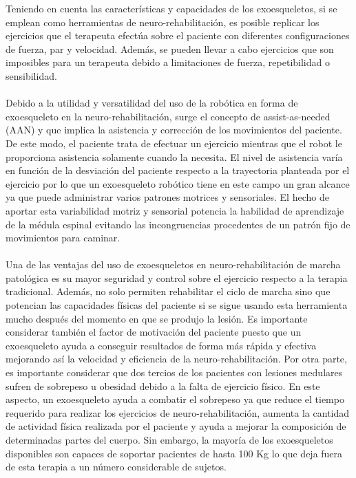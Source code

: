 Teniendo en cuenta las características y capacidades de los exoesqueletos, si se emplean como herramientas de neuro-rehabilitación, es posible replicar los ejercicios que el terapeuta efectúa sobre el paciente con diferentes configuraciones de fuerza, par y velocidad. Además, se pueden llevar a cabo ejercicios que son imposibles para un terapeuta debido a limitaciones de fuerza, repetibilidad o sensibilidad\cite{robotica_rehabilitacion}.
\\
\\
Debido a la utilidad y versatilidad del uso de la robótica en forma de exoesqueleto en la neuro-rehabilitación, surge el concepto de assist-as-needed (AAN)\cite{assist_as_need} y que implica la asistencia y corrección de los movimientos del paciente. De este modo, el paciente trata de efectuar un ejercicio mientras que el robot le proporciona asistencia solamente cuando la necesita. El nivel de asistencia varía en función de la desviación del paciente respecto a la trayectoria planteada por el ejercicio por lo que un exoesqueleto robótico tiene en este campo un gran alcance ya que puede administrar varios patrones motrices y sensoriales. El hecho de aportar esta variabilidad motriz y sensorial potencia la habilidad de aprendizaje de la médula espinal evitando las incongruencias procedentes de un patrón fijo de movimientos para caminar.
\\
\\
Una de las ventajas del uso de exoesqueletos en neuro-rehabilitación de marcha patológica es su mayor seguridad y control sobre el ejercicio respecto a la terapia tradicional. Además, no solo permiten rehabilitar el ciclo de marcha sino que potencian las capacidades físicas del paciente si se sigue usando esta herramienta mucho después del momento en que se produjo la lesión. Es importante considerar también el factor de motivación del paciente puesto que un exoesqueleto ayuda a conseguir resultados de forma más rápida y efectiva mejorando así la velocidad y eficiencia de la neuro-rehabilitación. Por otra parte, es importante considerar que dos tercios de los pacientes con lesiones medulares sufren de sobrepeso u obesidad debido a la falta de ejercicio físico. En este aspecto, un exoesqueleto ayuda a combatir el sobrepeso ya que reduce el tiempo requerido para realizar los ejercicios de neuro-rehabilitación, aumenta la cantidad de actividad física realizada por el paciente y ayuda a mejorar la composición de determinadas partes del cuerpo. Sin embargo, la mayoría de los exoesqueletos disponibles son capaces de soportar pacientes de hasta 100 Kg lo que deja fuera de esta terapia a un número considerable de sujetos\cite{ventajas_desventajas_exoesqueletos}. 
